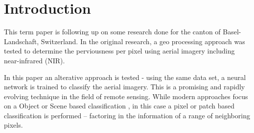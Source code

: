

\section{Introduction}
\label{introduction}

This term paper is following up on some research done for the canton of Basel-Landschaft, Switzerland.
In the original research, a geo processing approach was tested to determine the perviousness
per pixel using aerial imagery including near-infrared (NIR).

In this paper an alterative approach is tested - using the same data set, 
a neural network is trained to classify the aerial imagery.
This is a promising and rapidly evolving technique in the field of remote sensing.
While modern approaches focus on a Object or Scene based classification \autocite{thapaDeepLearningRemote2023},
in this case a pixel or patch based classification is performed -- factoring in the information of a range of neighboring pixels.

